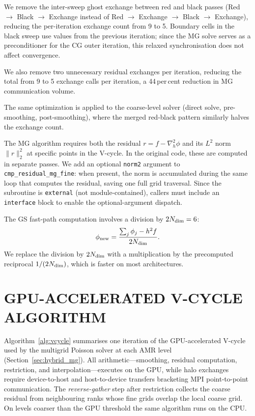 \documentclass[fleqn,usenatbib]{mnras}
\newcommand{\code}[1]{\texttt{#1}}
\begin{document}
We remove the inter-sweep ghost exchange between red and black passes
(Red $\to$ Black $\to$ Exchange instead of Red $\to$ Exchange $\to$
Black $\to$ Exchange), reducing the per-iteration exchange count from 9
to 5.  Boundary cells in the black sweep use values from the previous
iteration; since the MG solve serves as a preconditioner for the CG
outer iteration, this relaxed synchronisation does not affect
convergence.

We also remove two unnecessary residual exchanges per iteration,
reducing the total from 9 to 5 exchange calls per iteration, a
44\,per\,cent reduction in MG communication volume.

The same optimization is applied to the coarse-level solver
(direct solve, pre-smoothing, post-smoothing), where the merged
red-black pattern similarly halves the exchange count.

The MG algorithm requires both the residual $r = f - \nabla^2_h\phi$ and its
$L^2$ norm $\|r\|_2^2$ at specific points in the V-cycle. In the
original code, these are computed in separate passes. We add an
optional \code{norm2} argument to \code{cmp\_residual\_mg\_fine}:
when present, the norm is accumulated during the same loop that
computes the residual, saving one full grid traversal.
Since the subroutine is \code{external} (not module-contained), callers
must include an \code{interface} block to enable the optional-argument
dispatch.

The GS fast-path computation involves a division by
$2 N_{\rm dim} = 6$:
\begin{equation}
\phi_{\rm new} = \frac{\sum_j \phi_j - h^2 f}{2 N_{\rm dim}}.
\label{eq:gs_update}
\end{equation}
We replace the division by $2N_{\rm dim}$ with a multiplication by
the precomputed reciprocal $1/(2N_{\rm dim})$, which is faster
on most architectures.


\section{GPU-ACCELERATED V-CYCLE ALGORITHM}
\label{app:vcycle}

Algorithm~\ref{alg:vcycle} summarises one iteration of the
GPU-accelerated V-cycle used by the multigrid Poisson solver at each
AMR level (Section~\ref{sec:hybrid_mg}).  All arithmetic---smoothing,
residual computation, restriction, and interpolation---executes on the
GPU, while halo exchanges require device-to-host and host-to-device
transfers bracketing MPI point-to-point communication.  The
\emph{reverse-gather} step after restriction collects the coarse
residual from neighbouring ranks whose fine grids overlap the local
coarse grid.  On levels coarser than the GPU threshold the same
algorithm runs on the CPU.
\end{document}
